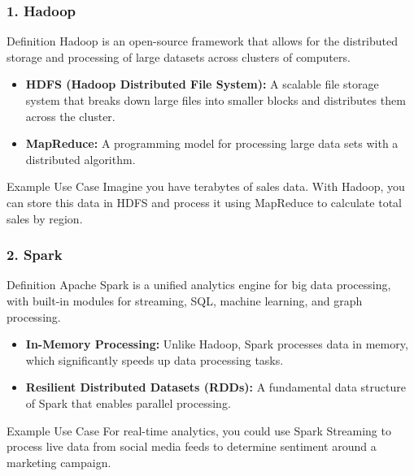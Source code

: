 \documentclass{beamer}
\begin{document}
\begin{frame}[fragile]
    \frametitle{1. Hadoop}
    \begin{block}{Definition}
        Hadoop is an open-source framework that allows for the distributed storage and processing of large datasets across clusters of computers.
    \end{block}
    \begin{itemize}
        \item \textbf{HDFS (Hadoop Distributed File System):} A scalable file storage system that breaks down large files into smaller blocks and distributes them across the cluster.
        \item \textbf{MapReduce:} A programming model for processing large data sets with a distributed algorithm.
    \end{itemize}
    \begin{block}{Example Use Case}
        Imagine you have terabytes of sales data. With Hadoop, you can store this data in HDFS and process it using MapReduce to calculate total sales by region.
    \end{block}
\end{frame}

\begin{frame}[fragile]
    \frametitle{2. Spark}
    \begin{block}{Definition}
        Apache Spark is a unified analytics engine for big data processing, with built-in modules for streaming, SQL, machine learning, and graph processing.
    \end{block}
    \begin{itemize}
        \item \textbf{In-Memory Processing:} Unlike Hadoop, Spark processes data in memory, which significantly speeds up data processing tasks.
        \item \textbf{Resilient Distributed Datasets (RDDs):} A fundamental data structure of Spark that enables parallel processing.
    \end{itemize}
    \begin{block}{Example Use Case}
        For real-time analytics, you could use Spark Streaming to process live data from social media feeds to determine sentiment around a marketing campaign.
    \end{block}
\end{frame}
\end{document}
